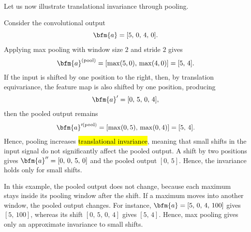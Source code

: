 Let us now illustrate translational invariance through pooling.
\begin{example}
Consider the convolutional output
$$
\bfm{a} = [5,\, 0,\, 4,\, 0].
$$
Applying max pooling with window size $2$ and stride $2$ gives
$$
\bfm{a}^{(\text{pool})} = [\max(5,0),\, \max(4,0)] = [5,\, 4].
$$
If the input is shifted by one position to the right, then, by translation equivariance, the feature map is also shifted by one position, producing
$$
\bfm{a}' = [0,\, 5,\, 0,\, 4],
$$
then the pooled output remains
$$
\bfm{a}^{\prime(\text{pool})} = [\max(0,5),\, \max(0,4)] = [5,\, 4].
$$
Hence, pooling increases \hl{translational invariance}, meaning that small shifts
in the input signal do not significantly affect the pooled output. A shift by two positions gives $\bfm{a}'' = [0,\, 0,\, 5,\, 0]$ and the pooled output $[0,\, 5]$. Hence, the invariance holds only for small shifts.

\end{example}
\begin{note}
In this example, the pooled output does not change, because each maximum stays inside its pooling window after the shift. If a maximum moves into another window, the pooled output changes. For instance, $\bfm{a} = [5,\, 0,\, 4,\, 100]$ gives $[5,\, 100]$, whereas its shift $[0,\, 5,\, 0,\, 4]$ gives $[5,\, 4]$. Hence, max pooling gives only an approximate invariance to small shifts.
\end{note}
